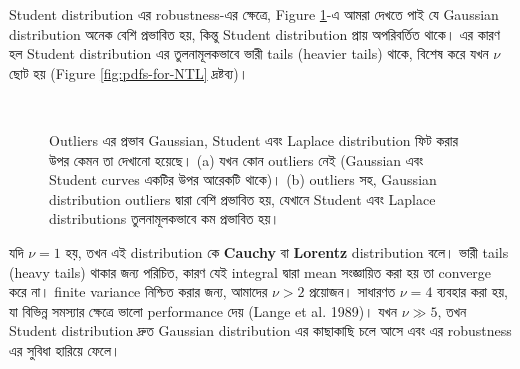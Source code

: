 \documentclass[graybox, envcountchap, twocolumn]{styles/svmult}
\begin{document}
{\bengalifont Student distribution এর robustness-এর ক্ষেত্রে, Figure \ref{fig:robustness}-এ আমরা দেখতে পাই যে Gaussian distribution অনেক বেশি প্রভাবিত হয়, কিন্তু Student distribution প্রায় অপরিবর্তিত থাকে। এর কারণ হল Student distribution এর তুলনামূলকভাবে ভারী tails (heavier tails) থাকে, বিশেষ করে যখন $\nu$ ছোট হয় (Figure \ref{fig:pdfs-for-NTL} দ্রষ্টব্য)।}

\begin{figure}[hbtp]
\centering
{} \\
\caption{{\bengalifont Outliers এর প্রভাব Gaussian, Student এবং Laplace distribution ফিট করার উপর কেমন তা দেখানো হয়েছে। (a) যখন কোন outliers নেই (Gaussian এবং Student curves একটির উপর আরেকটি থাকে)। (b)  outliers সহ, Gaussian distribution outliers দ্বারা বেশি প্রভাবিত হয়, যেখানে Student এবং Laplace distributions তুলনামূলকভাবে কম প্রভাবিত হয়।}
}
\label{fig:robustness} 
\end{figure}
\bengalifont 
যদি $\nu=1$ হয়, তখন এই distribution কে \textbf{Cauchy} বা \textbf{Lorentz} distribution বলে। ভারী tails (heavy tails) থাকার জন্য পরিচিত, কারণ যেই integral দ্বারা mean সংজ্ঞায়িত করা হয় তা converge করে না।
 finite variance নিশ্চিত করার জন্য, আমাদের $\nu>2$ প্রয়োজন। সাধারণত $\nu=4$ ব্যবহার করা হয়, যা বিভিন্ন সমস্যার ক্ষেত্রে ভালো performance দেয় (Lange et al. 1989)। যখন $\nu \gg 5$, তখন Student distribution দ্রুত Gaussian distribution এর কাছাকাছি চলে আসে এবং এর robustness এর সুবিধা হারিয়ে ফেলে।
\end{document}
